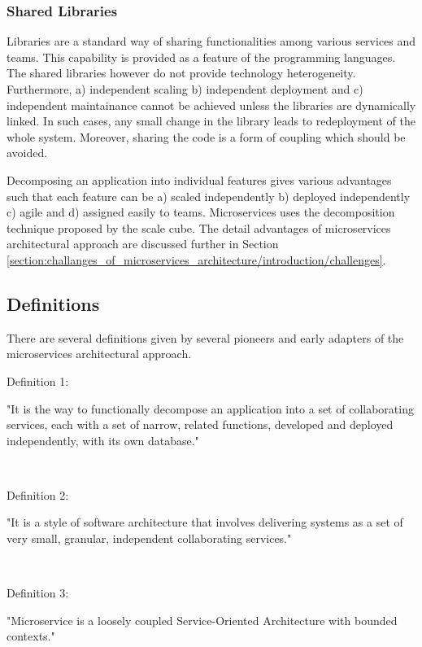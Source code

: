 \subsubsection{Shared Libraries}\label{section:context/microservices_architecture_style/decompostion_of_an_application/shared_libraries}
Libraries are a standard way of sharing functionalities among various services and teams. This capability is provided as a feature of the programming languages. The shared libraries however do not provide technology heterogeneity. Furthermore,  a) independent scaling b) independent deployment and c) independent maintainance cannot be achieved unless the libraries are dynamically linked. In such cases, any small change in the library leads to redeployment of the whole system. Moreover, sharing the code is a form of coupling which should be avoided.

Decomposing an application into individual features gives various advantages such that each feature can be a) scaled independently b) deployed independently c) agile and d) assigned easily to teams. Microservices uses the decomposition technique proposed by the scale cube. The detail advantages of microservices architectural approach are discussed further in Section \ref{section:challanges_of_microservices_architecture/introduction/challenges}.
\subsection{Definitions}\label{section:context/microservices_architecture_style/definitions}
There are several definitions given by several pioneers and early adapters of the microservices architectural approach.
\\
\begin{shaded}Definition 1: \cite{Richardson:2014ac} \end{shaded}
"It is the way to functionally decompose an application into a set of collaborating services, each with a set of narrow, related functions, developed and deployed independently, with its own database."

\\
\begin{shaded}Definition 2: \cite{Wootton:2014aa}\end{shaded}
"It is a style of software architecture that involves delivering systems as a set of very small, granular, independent collaborating services."


\\
\begin{shaded}Definition 3: \cite{Cockcroft:2015aa}\end{shaded}
"Microservice is a loosely coupled Service-Oriented Architecture with bounded contexts."


